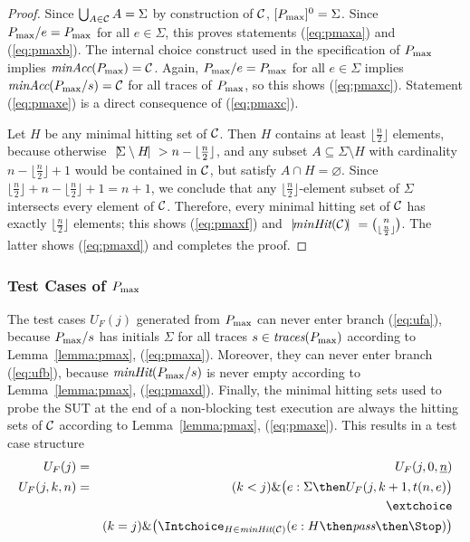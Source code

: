 \begin{proof}
 Since  
$
\bigcup_{A\in{\cal C}} A = \Sigma
$
by construction of ${\cal C}$, $[P_\text{max}]^0 = \Sigma$. Since $P_\text{max}/e = P_\text{max}$ for all
$e\in\Sigma$, this proves statements (\ref{eq:pmaxa}) and (\ref{eq:pmaxb}).
The internal choice construct used in the specification of $P_\text{max}$ implies
$\text{\it minAcc}(P_\text{max}) = {\cal C}$. Again, $P_\text{max}/e = P_\text{max}$ for all
$e\in\Sigma$ implies $\text{\it minAcc}(P_\text{max}/s) = {\cal C}$ for all traces of $P_\text{max}$, so this shows (\ref{eq:pmaxc}). Statement (\ref{eq:pmaxe}) is a direct consequence
of (\ref{eq:pmaxc}).

Let $H$ be any minimal hitting set of ${\cal C}$. Then
$H$ contains at least $\lfloor{\frac{n}{2}}\rfloor$ elements, because
otherwise ${~|\! \Sigma\setminus H\!|~} > n-\lfloor{\frac{n}{2}}\rfloor$, and any
subset $A\subseteq \Sigma\setminus H$ with cardinality
$n-\lfloor{\frac{n}{2}}\rfloor+1$  would be contained in ${\cal C}$, but satisfy
$A\cap H=\varnothing$. Since
$\lfloor{\frac{n}{2}}\rfloor+n-\lfloor{\frac{n}{2}}\rfloor+1=n+1$, we
conclude
 that any $\lfloor{\frac{n}{2}}\rfloor$-element subset of $\Sigma$
 intersects  every element of ${\cal C}$.  Therefore, every minimal hitting set of ${\cal C}$ has exactly $\lfloor{\frac{n}{2}}\rfloor$ elements; this shows (\ref{eq:pmaxf})
and ${~|\! \text{\it minHit}({\cal C})\!|~} = \binom{n}{\lfloor{\frac{n}{2}}\rfloor}$. The latter 
shows  (\ref{eq:pmaxd}) and completes the proof.
\xbox
\end{proof}

\subsubsection*{Test Cases of $P_\text{max}$}
The test cases $U_F(j)$ generated from $P_\text{max}$ 
can never enter branch (\ref{eq:ufa}), because $P_\text{max}/s$ has initials $\Sigma$ for
all traces $s\in\text{\it traces}(P_\text{max})$ according to Lemma~\ref{lemma:pmax}, (\ref{eq:pmaxa}).
Moreover, they can never enter branch (\ref{eq:ufb}), because $\text{\it minHit}(P_\text{max}/s)$
is never empty according to Lemma~\ref{lemma:pmax}, (\ref{eq:pmaxd}).
Finally, the minimal hitting sets used to probe the SUT at the end of a
non-blocking  test execution are always the hitting sets of ${\cal C}$ 
according to Lemma~\ref{lemma:pmax}, (\ref{eq:pmaxe}).
This results in a test case structure
\begin{eqnarray*}
\label{eq:UFP}
U_F(j) & = & U_F(j,0,\ii n)
\\
U_F(j,k,n) & = &   (k < j) \& \big(e:\Sigma   \then U_F(j,k+1,t(n,e) \big)
\\ & & \extchoice  
\\ & & (k = j) \& \big( \Intchoice_{H\in\minhits({\cal C})} (e:H   \then \epass \then\Stop   )  \big)
\end{eqnarray*}



